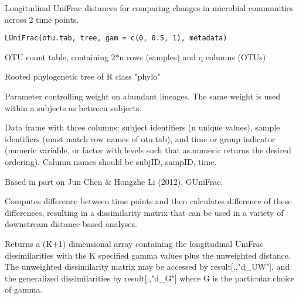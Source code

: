 \documentclass[a4paper]{book}
\begin{document}
%
\begin{Description}\relax
Longitudinal UniFrac distances for comparing changes in
microbial communities across 2 time points.
\end{Description}
%
\begin{Usage}
\begin{verbatim}
LUniFrac(otu.tab, tree, gam = c(0, 0.5, 1), metadata)
\end{verbatim}
\end{Usage}
%
\begin{Arguments}
\begin{ldescription}
\item[\code{otu.tab}] OTU count table, containing 2*n rows (samples) and q columns (OTUs)

\item[\code{tree}] Rooted phylogenetic tree of R class "phylo"

\item[\code{gam}] Parameter controlling weight on abundant lineages. The same weight is used within a subjects as between subjects.

\item[\code{metadata}] Data frame with three columns: subject identifiers (n unique values), 
sample identifiers (must match row names of otu.tab), 
and time or group indicator (numeric variable, or factor with levels such that as.numeric returns 
the desired ordering). Column names should be subjID, sampID, time.
\end{ldescription}
\end{Arguments}
%
\begin{Details}\relax
Based in part on Jun Chen \& Hongzhe Li (2012), GUniFrac.

Computes difference between time points and then calculates
difference of these differences, resulting in a dissimilarity
matrix that can be used in a variety of downstream 
distance-based analyses.
\end{Details}
%
\begin{Value}
Returns a (K+1) dimensional array containing the longitudinal UniFrac dissimilarities 
with the K specified gamma values plus the unweighted distance. The unweighted dissimilarity 
matrix may be accessed by result[,,"d\_UW"], and the generalized dissimilarities by result[,,"d\_G"] 
where G is the particular choice of gamma.
\end{Value}
\end{document}

